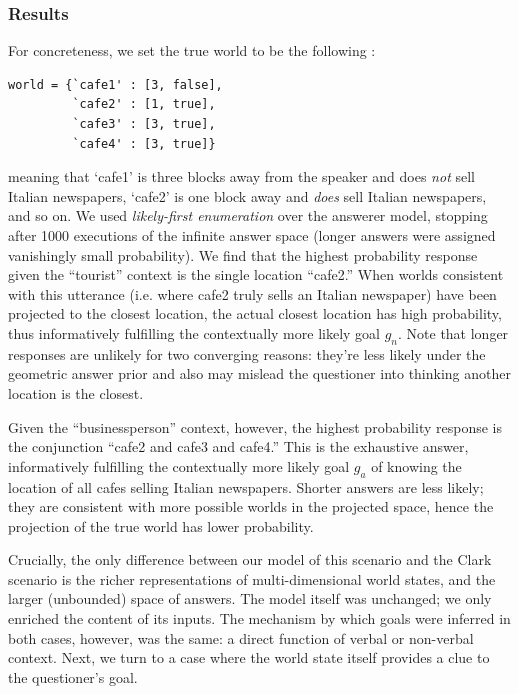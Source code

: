 \documentclass[12pt, floatsintext, jou]{apa6}
\begin{document}
\subsubsection{Results}

For concreteness, we set the true world to be the following :

\begin{lstlisting}
world = {`cafe1' : [3, false],
         `cafe2' : [1, true],
         `cafe3' : [3, true],
         `cafe4' : [3, true]}
\end{lstlisting}
meaning that `cafe1' is three blocks away from the speaker and does \emph{not} sell Italian newspapers, `cafe2' is one block away and \emph{does} sell Italian newspapers, and so on. We used \emph{likely-first enumeration} over the answerer model, stopping after 1000 executions of the infinite answer space (longer answers were assigned vanishingly small probability). We find that the highest probability response given the ``tourist'' context is the single location ``cafe2.'' When worlds consistent with this utterance (i.e. where cafe2 truly sells an Italian newspaper) have been projected to the closest location, the actual closest location has high probability, thus informatively fulfilling the contextually more likely goal $g_n$. Note that longer responses are unlikely for two converging reasons: they're less likely under the geometric answer prior and also may mislead the questioner into thinking another location is the closest. 

Given the ``businessperson'' context, however, the highest probability response is the conjunction ``cafe2 and cafe3 and cafe4.'' This is the exhaustive answer, informatively fulfilling the contextually more likely goal $g_a$ of knowing the location of all cafes selling Italian newspapers. Shorter answers are less likely; they are consistent with more possible worlds in the projected space, hence the projection of the true world has lower probability. 

Crucially, the only difference between our model of this scenario and the Clark scenario is the richer representations of multi-dimensional world states, and the larger (unbounded) space of answers. The model itself was unchanged; we only enriched the content of its inputs. The mechanism by which goals were inferred in both cases, however, was the same: a direct function of verbal or non-verbal context. Next, we turn to a case where the world state itself provides a clue to the questioner's goal.
\end{document}
